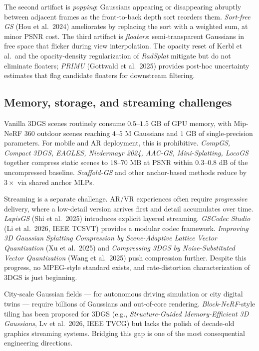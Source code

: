 \documentclass{article}
\begin{document}
The second artifact is \emph{popping}: Gaussians appearing or disappearing abruptly between adjacent frames as the front-to-back depth sort reorders them. \emph{Sort-free GS} (Hou et al.~2024) ameliorates by replacing the sort with a weighted sum, at minor PSNR cost. The third artifact is \emph{floaters}: semi-transparent Gaussians in free space that flicker during view interpolation. The opacity reset of Kerbl et al.~and the opacity-density regularization of \emph{RadSplat} mitigate but do not eliminate floaters; \emph{PRIMU} (Gottwald et al.~2025) provides post-hoc uncertainty estimates that flag candidate floaters for downstream filtering.

\subsection{Memory, storage, and streaming challenges}\label{memory-storage-and-streaming-challenges}

Vanilla 3DGS scenes routinely consume \(0.5\)--\(1.5\) GB of GPU memory, with Mip-NeRF 360 outdoor scenes reaching \(4\)--\(5\) M Gaussians and \(1\) GB of single-precision parameters. For mobile and AR deployment, this is prohibitive. \emph{CompGS, Compact 3DGS, EAGLES, Niedermayr 2024, AAC-GS, Mini-Splatting, LocoGS} together compress static scenes to \(18\)--\(70\) MB at PSNR within \(0.3\)--\(0.8\) dB of the uncompressed baseline. \emph{Scaffold-GS} and other anchor-based methods reduce by \(3\times\) via shared anchor MLPs.

Streaming is a separate challenge. AR/VR experiences often require \emph{progressive} delivery, where a low-detail version arrives first and detail accumulates over time. \emph{LapisGS} (Shi et al.~2025) introduces explicit layered streaming. \emph{GSCodec Studio} (Li et al.~2026, IEEE TCSVT) provides a modular codec framework. \emph{Improving 3D Gaussian Splatting Compression by Scene-Adaptive Lattice Vector Quantization} (Xu et al.~2025) and \emph{Compressing 3DGS by Noise-Substituted Vector Quantization} (Wang et al.~2025) push compression further. Despite this progress, no MPEG-style standard exists, and rate-distortion characterization of 3DGS is just beginning.

City-scale Gaussian fields --- for autonomous driving simulation or city digital twins --- require billions of Gaussians and out-of-core rendering. \emph{Block-NeRF}-style tiling has been proposed for 3DGS (e.g., \emph{Structure-Guided Memory-Efficient 3D Gaussians}, Lv et al.~2026, IEEE TVCG) but lacks the polish of decade-old graphics streaming systems. Bridging this gap is one of the most consequential engineering directions.
\end{document}

